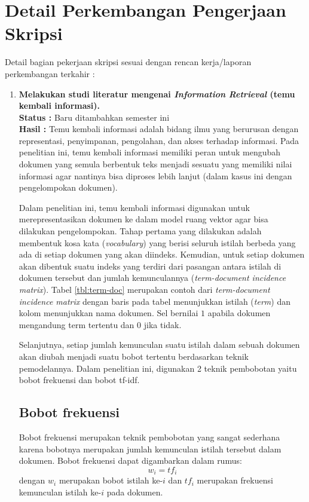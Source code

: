 \documentclass[a4paper,twoside]{article}
\begin{document}
\section{Detail Perkembangan Pengerjaan Skripsi}
Detail bagian pekerjaan skripsi sesuai dengan rencan kerja/laporan perkembangan terkahir :
	\begin{enumerate}
		\item \textbf{Melakukan studi literatur mengenai {\it Information Retrieval} (temu kembali informasi).}\\
		{\bf Status :} Baru ditambahkan semester ini\\
		{\bf Hasil :} Temu kembali informasi adalah bidang ilmu yang berurusan dengan representasi, penyimpanan, pengolahan, dan akses terhadap informasi. Pada penelitian ini, temu kembali informasi memiliki peran untuk mengubah dokumen yang semula berbentuk teks menjadi sesuatu yang memiliki nilai informasi agar nantinya bisa diproses lebih lanjut (dalam kasus ini dengan pengelompokan dokumen).

Dalam penelitian ini, temu kembali informasi digunakan untuk merepresentasikan dokumen ke dalam model ruang vektor agar bisa dilakukan pengelompokan. Tahap pertama yang dilakukan adalah membentuk kosa kata (\textit{vocabulary}) yang berisi seluruh istilah berbeda yang ada di setiap dokumen yang akan diindeks. Kemudian, untuk setiap dokumen akan dibentuk suatu indeks yang terdiri dari pasangan antara istilah di dokumen tersebut dan jumlah kemunculannya (\textit{term-document incidence matrix}). Tabel \ref{tbl:term-doc} merupakan contoh dari \textit{term-document incidence matrix} dengan baris pada tabel menunjukkan istilah (\textit{term}) dan kolom menunjukkan nama dokumen. Sel bernilai $1$ apabila dokumen mengandung term tertentu dan $0$ jika tidak.

Selanjutnya, setiap jumlah kemunculan suatu istilah dalam sebuah dokumen akan diubah menjadi suatu bobot tertentu berdasarkan teknik pemodelannya. Dalam penelitian ini, digunakan 2 teknik pembobotan yaitu bobot frekuensi dan bobot tf-idf.

\subsection*{Bobot frekuensi}
Bobot frekuensi merupakan teknik pembobotan yang sangat sederhana karena bobotnya merupakan jumlah kemunculan istilah tersebut dalam dokumen. Bobot frekuensi dapat digambarkan dalam rumus:
\begin{equation}
w_i=tf_i
\end{equation}
dengan $w_i$ merupakan bobot istilah ke-$i$ dan $tf_i$ merupakan frekuensi kemunculan istilah ke-$i$ pada dokumen.


\end{enumerate}
\end{document}
